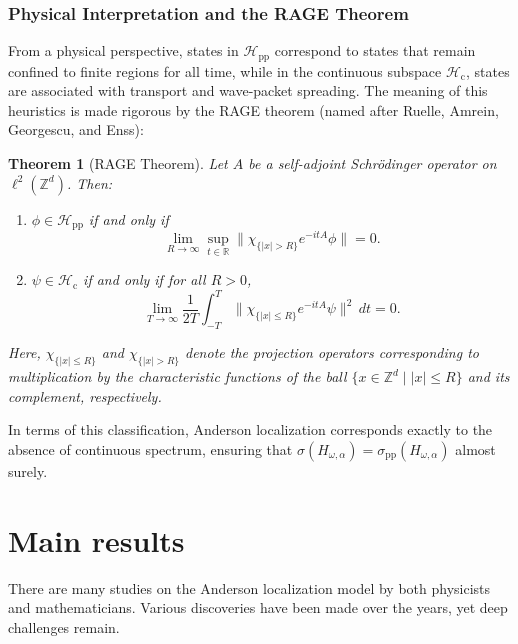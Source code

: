 \documentclass[11pt, a4paper, UKenglish, oneside]{book}
\theoremstyle{plain}
\newtheorem{theorem}{Theorem}
\theoremstyle{remark}
\theoremstyle{definition}
\numberwithin{equation}{section}
\numberwithin{theorem}{section}
\begin{document}
\subsubsection*{Physical Interpretation and the RAGE Theorem}
From a physical perspective, states in $\mathcal{H}_{\mathrm{pp}}$ correspond to states that remain confined to finite regions for all time, while in the continuous subspace $\mathcal{H}_{\mathrm{c}}$, states are associated with transport and wave-packet spreading. The meaning of this heuristics is made rigorous by the RAGE theorem (named after Ruelle, Amrein, Georgescu, and Enss):

\begin{theorem}[RAGE Theorem]\label{thm:RAGE}
    Let $A$ be a self-adjoint Schrödinger operator on $\ell^2(\mathbb{Z}^d)$. Then:
    \begin{enumerate}
        \item[\textup{(i)}] $\phi \in \mathcal{H}_{\mathrm{pp}}$ if and only if
        \begin{equation}
            \lim_{R \to \infty} \sup_{t \in \mathbb{R}} \|\chi_{\{|x| > R\}} e^{-itA} \phi\| = 0.
        \end{equation}
        \item[\textup{(ii)}] $\psi \in \mathcal{H}_{\mathrm{c}}$ if and only if for all $R > 0$,
        \begin{equation}
            \lim_{T \to \infty} \frac{1}{2T} \int_{-T}^T \|\chi_{\{|x| \le R\}} e^{-itA} \psi\|^2 \, dt = 0.
        \end{equation}
    \end{enumerate}
    Here, $\chi_{\{|x| \le R\}}$ and $\chi_{\{|x| > R\}}$ denote the projection operators corresponding to multiplication by the characteristic functions of the ball $\{x \in \mathbb{Z}^d \mid |x| \le R\}$ and its complement, respectively.
\end{theorem}

In terms of this classification, Anderson localization corresponds exactly to the absence of continuous spectrum, ensuring that $\sigma(H_{\omega,\alpha}) = \sigma_{\mathrm{pp}}(H_{\omega,\alpha})$ almost surely.

\section{Main results} \label{sec:Mainresults}

There are many studies on the Anderson localization model by both physicists and mathematicians. Various discoveries have been made over the years, yet deep challenges remain. \\
\end{document}
